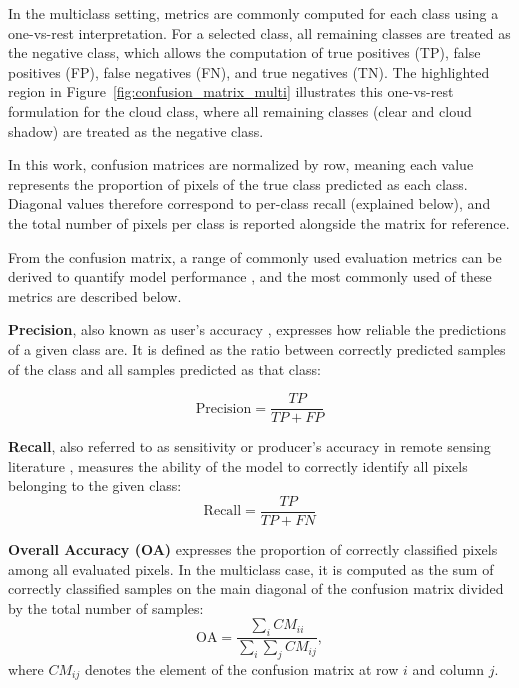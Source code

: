 In the multiclass setting, metrics are commonly computed for each class using a one-vs-rest interpretation. For a selected class, all remaining classes are treated as the negative class, which allows the computation of true positives (TP), false positives (FP), false negatives (FN), and true negatives (TN). The highlighted region in Figure~\ref{fig:confusion_matrix_multi} illustrates this one-vs-rest formulation for the cloud class, where all remaining classes (clear and cloud shadow) are treated as the negative class.

In this work, confusion matrices are normalized by row, meaning each value represents the proportion of pixels of the true class predicted as each class. Diagonal values therefore correspond to per-class recall (explained below), and the total number of pixels per class is reported alongside the matrix for reference.

From the confusion matrix, a range of commonly used evaluation metrics can be derived to quantify model performance \cite{powers2020}, and the most commonly used of these metrics are described below.

\textbf{Precision}, also known as user's accuracy \cite{wright2024}, expresses how reliable the predictions of a given class are. It is defined as the ratio between correctly predicted samples of the class and all samples predicted as that class:

\begin{equation}
\mathrm{Precision} = \frac{TP}{TP + FP}
\end{equation}

\textbf{Recall}, also referred to as sensitivity or producer's accuracy in remote sensing literature \cite{wright2024}, measures the ability of the model to correctly identify all pixels belonging to the given class:
\begin{equation}
\mathrm{Recall} = \frac{TP}{TP + FN}
\end{equation}

\textbf{Overall Accuracy (OA)} expresses the proportion of correctly classified pixels among all evaluated pixels. In the multiclass case, it is computed as the sum of correctly classified samples on the main diagonal of the confusion matrix divided by the total number of samples:
\begin{equation}
\mathrm{OA} = \frac{\sum_i CM_{ii}}{\sum_i \sum_j CM_{ij}},
\end{equation}
where $CM_{ij}$ denotes the element of the confusion matrix at row $i$ and column $j$. 

